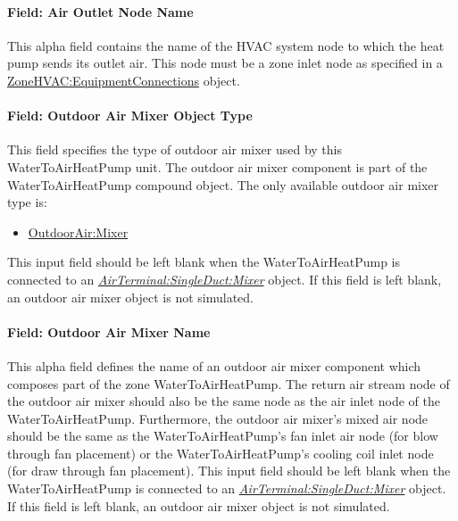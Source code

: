 \paragraph{Field: Air Outlet Node Name}\label{field-air-outlet-node-name-8-001}

This alpha field contains the name of the HVAC system node to which the heat pump sends its outlet air. This node must be a zone inlet node as specified in a \hyperref[zonehvacequipmentconnections]{ZoneHVAC:EquipmentConnections} object.

\paragraph{Field: Outdoor Air Mixer Object Type}\label{field-outdoor-air-mixer-object-type-4}

This field specifies the type of outdoor air mixer used by this WaterToAirHeatPump unit. The outdoor air mixer component is part of the WaterToAirHeatPump compound object. The only available outdoor air mixer type is:

\begin{itemize}
\tightlist
\item
  \hyperref[outdoorairmixer]{OutdoorAir:Mixer}
\end{itemize}

This input field should be left blank when the WaterToAirHeatPump is connected to an \textit{\hyperref[airterminalsingleductmixer]{AirTerminal:SingleDuct:Mixer}} object. If this field is left blank, an outdoor air mixer object is not simulated.

\paragraph{Field: Outdoor Air Mixer Name}\label{field-outdoor-air-mixer-name-4}

This alpha field defines the name of an outdoor air mixer component which composes part of the zone WaterToAirHeatPump. The return air stream node of the outdoor air mixer should also be the same node as the air inlet node of the WaterToAirHeatPump. Furthermore, the outdoor air mixer's mixed air node should be the same as the WaterToAirHeatPump's fan inlet air node (for blow through fan placement) or the WaterToAirHeatPump's cooling coil inlet node (for draw through fan placement). This input field should be left blank when the WaterToAirHeatPump is connected to an \textit{\hyperref[airterminalsingleductmixer]{AirTerminal:SingleDuct:Mixer}} object. If this field is left blank, an outdoor air mixer object is not simulated.

